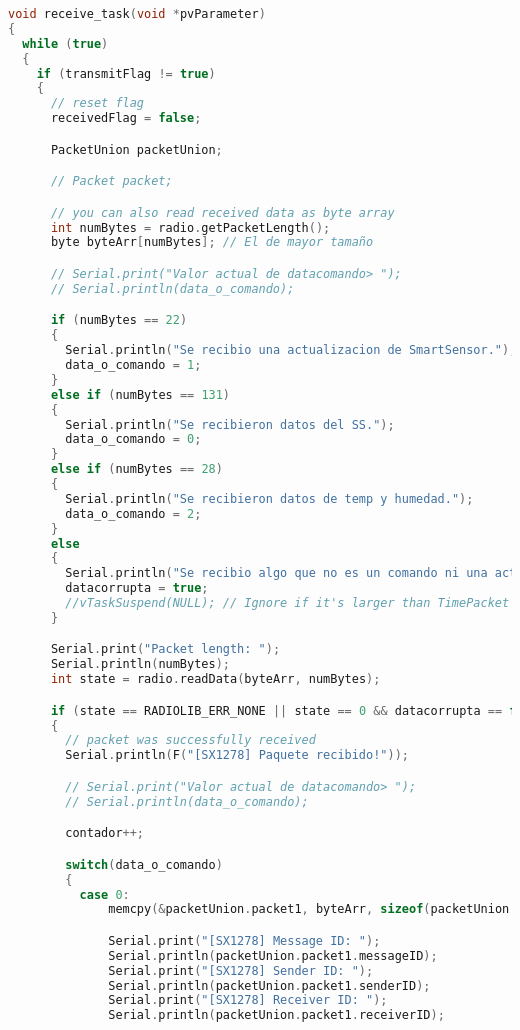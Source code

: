 \begin{lstlisting}[language=C++, caption=Tarea de recepción de datos de aceleración vía Lora en estación base]
void receive_task(void *pvParameter)
{
  while (true)
  {
    if (transmitFlag != true)
    {
      // reset flag
      receivedFlag = false;

      PacketUnion packetUnion;

      // Packet packet;

      // you can also read received data as byte array
      int numBytes = radio.getPacketLength();
      byte byteArr[numBytes]; // El de mayor tamaño

      // Serial.print("Valor actual de datacomando> ");
      // Serial.println(data_o_comando);

      if (numBytes == 22)
      {
        Serial.println("Se recibio una actualizacion de SmartSensor.");
        data_o_comando = 1;
      }
      else if (numBytes == 131)
      {
        Serial.println("Se recibieron datos del SS.");
        data_o_comando = 0;
      }
      else if (numBytes == 28)
      {
        Serial.println("Se recibieron datos de temp y humedad.");
        data_o_comando = 2;
      }
      else
      {
        Serial.println("Se recibio algo que no es un comando ni una actualizacion de RTC.");
        datacorrupta = true;
        //vTaskSuspend(NULL); // Ignore if it's larger than TimePacket
      }

      Serial.print("Packet length: ");
      Serial.println(numBytes);
      int state = radio.readData(byteArr, numBytes);

      if (state == RADIOLIB_ERR_NONE || state == 0 && datacorrupta == false)
      {
        // packet was successfully received
        Serial.println(F("[SX1278] Paquete recibido!"));

        // Serial.print("Valor actual de datacomando> ");
        // Serial.println(data_o_comando);

        contador++;

        switch(data_o_comando)
        {
          case 0:
              memcpy(&packetUnion.packet1, byteArr, sizeof(packetUnion.packet1));

              Serial.print("[SX1278] Message ID: ");
              Serial.println(packetUnion.packet1.messageID);
              Serial.print("[SX1278] Sender ID: ");
              Serial.println(packetUnion.packet1.senderID);
              Serial.print("[SX1278] Receiver ID: ");
              Serial.println(packetUnion.packet1.receiverID);


\end{lstlisting}
